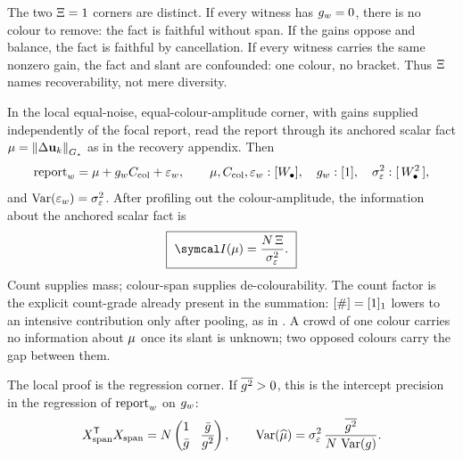 \documentclass[../main]{subfiles}
\begin{document}
The two $\Xi=1$ corners are distinct. If every witness has
$g\sb{w}=0$, there is no colour to remove: the fact is faithful without span. If the
gains oppose and balance, the fact is faithful by cancellation. If every witness carries the
same nonzero gain, the fact and slant are confounded: one colour, no bracket. Thus
$\Xi$ names recoverability, not mere diversity.

\begin{proposition}
  In the local equal-noise, equal-colour-amplitude corner, with gains supplied independently
  of the focal report, read the report through its anchored scalar fact
  $\mu=\left\lVert \Delta\mathbf{u}\sb{k} \right\rVert\sb{ \ensuremath{G\sb{\star}} }$ as in the recovery appendix. Then
  \begin{equation}
    \operatorname{report}\sb{w}
      =\mu+g\sb{w}C\sb{\mathrm{col}}+\varepsilon\sb{w},
    \qquad
    \mu,C\sb{\mathrm{col}},\varepsilon\sb{w}:[W\sb{\bullet}],\quad
    g\sb{w}:[1],\quad
    \sigma\sb{\varepsilon}\sp{2}:[\,W\sb{\bullet}\sp{2}\,],
    \label{eq:pr:span-model}
  \end{equation}
  and $\operatorname{Var}(\varepsilon\sb{w})=\sigma\sb{\varepsilon}\sp{2}$. After profiling out the
  colour-amplitude, the information about the anchored scalar fact is
  \begin{equation}
    \boxed{\ \precisionof{\recoveryfact}
      =\frac{\countof\,\colourspan}{\spannoisevariance}.\ }
    \label{eq:pr:span-ident}
  \end{equation}
  Count supplies mass; colour-span supplies de-colourability. The count factor is the
  explicit count-grade already present in the summation: $[\#]=[1]\sb{1}$ lowers to
  an intensive contribution only after pooling, as in . A crowd of one colour
  carries no information about $\mu$ once its slant is unknown; two opposed colours
  carry the gap between them.
\end{proposition}

The local proof is the regression corner. If $\overline{g\sp{2}}>0$, this is the intercept
precision in the regression of $\operatorname{report}\sb{w}$ on $g\sb{w}$:
\begin{equation}
  \spanregressordesign\transpose\spanregressordesign
  =
  \countof
  \begin{pmatrix}
    1 & \meancolourgain\\
    \meancolourgain & \meansqcolourgain
  \end{pmatrix},
  \qquad
  \operatorname{Var}(\widehat{\recoveryfact})
  =
  \spannoisevariance\,
  \frac{\meansqcolourgain}{\countof\,\varcolourgain}.
  \label{eq:pr:span-proof}
\end{equation}
\end{document}
